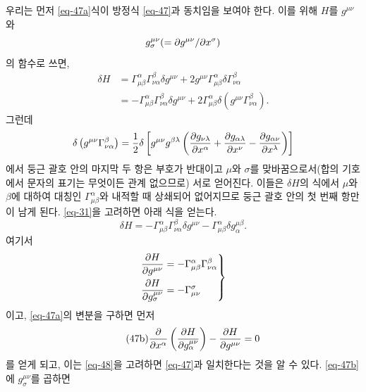 \documentclass[b5paper]{article}
\begin{document}
우리는 먼저 \eqref{eq-47a}식이 방정식 \eqref{eq-47}과 동치임을 보여야 한다. 이를 위해 
$ H $를 $ g^{\mu\nu} $와 $$ g^{\mu\nu}_\sigma (= {{{\partial}{g^{\mu\nu}}}/{{\partial}{x^\sigma}}})$$의 함수로 쓰면, 
\begin{equation*}
	\begin{aligned}
	\delta H &= \Gamma_{\mu\beta}^{\alpha} \Gamma_{\nu\alpha}^{\beta}\delta g^{\mu\nu}
	    + 2 g^{\mu\nu} \Gamma_{\mu\beta}^{\alpha} \delta\Gamma_{\nu\alpha}^{\beta} \\
	    &= -\Gamma_{\mu\beta}^{\alpha} \Gamma_{\nu\alpha}^{\beta}\delta g^{\mu\nu}
	    + 2\Gamma_{\mu\beta}^{\alpha} \delta \left( g^{\mu\nu} \Gamma_{\nu\alpha}^{\beta} \right).
	\end{aligned}
\end{equation*}
그런데
\begin{equation*}
	 \delta \left( g^{\mu\nu} \Gamma_{\nu\alpha}^{\beta} \right)
	 = \frac{1}{2}\delta\left[ g^{\mu\nu} g^{\beta\lambda} 
	 \left(
	 	{\frac{{\partial}{g_{\nu\lambda}}}{{\partial}{x^\alpha}}}
	 	+ {\frac{{\partial}{g_{\alpha\lambda}}}{{\partial}{x^\nu}}}
	 	- {\frac{{\partial}{g_{\alpha\nu}}}{{\partial}{x^\lambda}}}
	 \right)
	 \right]
\end{equation*}
에서 둥근 괄호 안의 마지막 두 항은 부호가 반대이고 \ind{} $\mu$와 $\sigma$를 맞바꿈으로서(합의 기호에서 \ind{} 문자의 표기는 무엇이든 관계 없으므로) 서로 얻어진다. 이들은 $ \delta H $의 식에서 \ind{} $\mu$와 $\beta$에 대하여 대칭인 $\Gamma_{\mu\beta}^{\alpha}$와 내적할 때 상쇄되어 없어지므로 둥근 괄호 안의 첫 번째 항만이 남게 된다. \eqref{eq-31}을 고려하면 아래 식을 얻는다.
\begin{equation*}
	\delta H = -\Gamma_{\mu\beta}^{\alpha} \Gamma_{\nu\alpha}^{\beta} \delta g^{\mu\nu}
	-\Gamma_{\mu\beta}^{\alpha}\delta g_\alpha^{\mu\beta}.
\end{equation*}
여기서
\begin{equation} \label{eq-48}
\left.
\begin{aligned}
&{\frac{{\partial}{H}}{{\partial}{g^{\mu\nu}}}}=-\Gamma_{\mu\beta}^\alpha \Gamma_{\nu\alpha}^\beta\\
&{\frac{{\partial}{H}}{{\partial}{g_\sigma^{\mu\nu}}}}=-\Gamma_{\mu\nu}^\sigma
\end{aligned} \right\}
\end{equation}
이고, \eqref{eq-47a}의 변분을 구하면 먼저
\begin{equation} \tag{47b} \label{eq-47b}
	{\frac{{\partial}{}}{{\partial}{x^\alpha}}}\left({\frac{{\partial}{H}}{{\partial}{g_\alpha^{\mu\nu}}}}\right)-{\frac{{\partial}{H}}{{\partial}{g^{\mu\nu}}}}=0
\end{equation}
를 얻게 되고, 이는 \eqref{eq-48}을 고려하면 \eqref{eq-47}과 일치한다는 것을 알 수 있다.
\eqref{eq-47b}에 $g_\sigma^{\mu\nu}$를 곱하면
\end{document}
